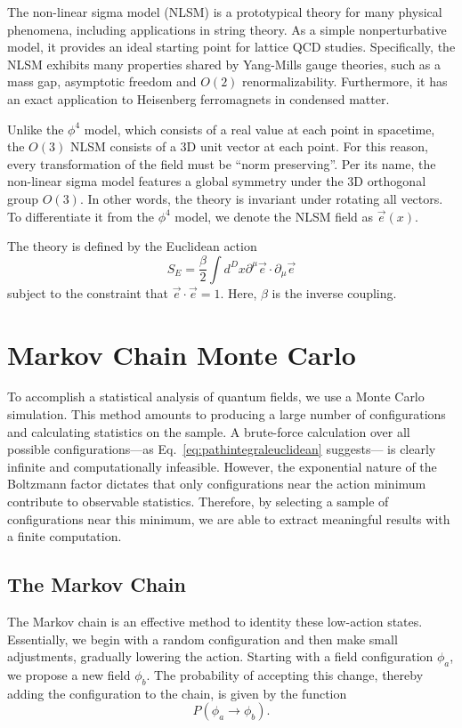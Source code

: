 \documentclass[12pt]{report}
\newcommand{\e}{\vec e}
\begin{document}
The non-linear sigma model (NLSM) is a prototypical theory for many physical phenomena, including applications in string theory. As a simple nonperturbative model, it provides an ideal starting point for lattice QCD studies. Specifically, the NLSM exhibits many properties shared by Yang-Mills gauge theories, such as a mass gap, asymptotic freedom and $O(2)$ renormalizability. Furthermore, it has an exact application to Heisenberg ferromagnets in condensed matter. 

Unlike the $\phi^4$ model, which consists of a real value at each point in spacetime, the $O(3)$ NLSM consists of a 3D unit vector at each point. For this reason, every transformation of the field must be ``norm preserving''. Per its name, the non-linear sigma model features a global symmetry under the 3D orthogonal group $O(3)$. In other words, the theory is invariant under rotating all vectors. To differentiate it from the $\phi^4$ model, we denote the NLSM field as $\e(x)$.

The theory is defined by the Euclidean action 
\begin{equation}
    \label{eq:nlsm euclidean action}
    S_E = \frac{\beta}{2} \int d^Dx \partial^\mu \e \cdot \partial_\mu \e
\end{equation}
subject to the constraint that $\e\cdot\e = 1$. Here, $\beta$ is the inverse coupling.


\section{Markov Chain Monte Carlo}

To accomplish a statistical analysis of quantum fields, we use a Monte Carlo simulation. This method amounts to producing a large number of configurations and calculating statistics on the sample. A brute-force calculation over all possible configurations---as Eq.~\ref{eq:pathintegraleuclidean} suggests--- is clearly infinite and computationally infeasible. However, the exponential nature of the Boltzmann factor dictates that only configurations near the action minimum contribute to observable statistics. Therefore, by selecting a sample of configurations near this minimum, we are able to extract meaningful results with a finite computation.

\subsection{The Markov Chain}
The Markov chain is an effective method to identity these low-action states. Essentially, we begin with a random configuration and then make small adjustments, gradually lowering the action. Starting with a field configuration $\phi_a$, we propose a new field $\phi_b$. The probability of accepting this change, thereby adding the configuration to the chain, is given by the function 
\[P(\phi_a \rightarrow \phi_b).\]
\end{document}
